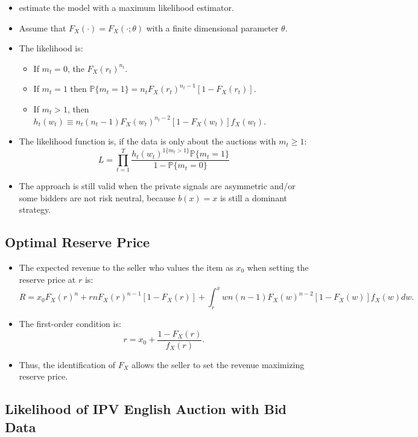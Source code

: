 \documentclass[]{book}
\providecommand{\tightlist}{%
  \setlength{\itemsep}{0pt}\setlength{\parskip}{0pt}}
\begin{document}
\begin{itemize}
\tightlist
\item
  \citet{donaldIdentificationEstimationTesting1996} estimate the model
  with a maximum likelihood estimator.
\item
  Assume that \(F_X(\cdot) = F_X(\cdot; \theta)\) with a finite
  dimensional parameter \(\theta\).
\item
  The likelihood is:

  \begin{itemize}
  \tightlist
  \item
    If \(m_t = 0\), the \(F_X(r_t)^{n_t}\).
  \item
    If \(m_t = 1\) then
    \(\mathbb{P}\{m_t = 1\} = n_t F_X(r_t)^{n_t - 1} [1 - F_X(r_t)]\).
  \item
    If \(m_t > 1\), then
    \(h_t(w_t) \equiv n_t (n_t - 1) F_X(w_t)^{n_t - 2} [1 - F_X(w_t)] f_X(w_t)\).
  \end{itemize}
\item
  The likelihood function is, if the data is only about the auctions
  with \(m_t \ge 1\): \[
  L = \prod_{t = 1}^T \frac{h_t(w_t)^{1\{m_t > 1\}} \mathbb{P}\{m_t = 1\}}{1 - \mathbb{P}\{m_t = 0\}}
  \]
\item
  The approach is still valid when the private signals are asymmetric
  and/or some bidders are not risk neutral, because \(b(x) = x\) is
  still a dominant strategy.
\end{itemize}

\subsection{Optimal Reserve Price}\label{optimal-reserve-price}

\begin{itemize}
\tightlist
\item
  The expected revenue to the seller who values the item as \(x_0\) when
  setting the reserve price at \(r\) is: \[
  R = x_0 F_X(r)^n + r n F_X(r)^{n - 1}[1 - F_X(r)] + \int_r^{\overline{x}} w n(n - 1)F_X(w)^{n - 2}[1 - F_X(w)] f_X(w) dw.
  \]
\item
  The first-order condition is: \[
  r = x_0 + \frac{1 - F_X(r)}{f_X(r)}.
  \]
\item
  Thus, the identification of \(F_X\) allows the seller to set the
  revenue maximizing reserve price.
\end{itemize}

\subsection{Likelihood of IPV English Auction with Bid
Data}\label{likelihood-of-ipv-english-auction-with-bid-data}
\end{document}
